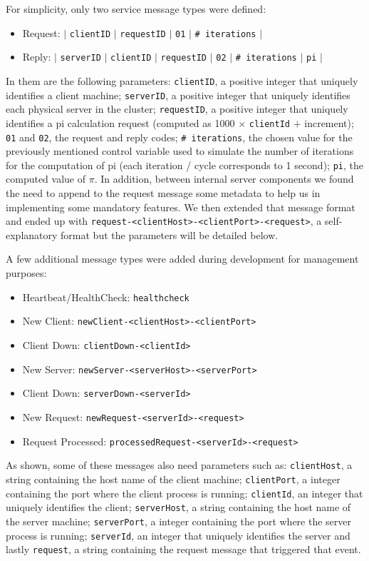 \documentclass[12pt]{article}
\begin{document}
For simplicity, only two service message types were defined:
\vspace{-10pt}
\begin{itemize}[noitemsep]
  \item Request: $|$ \texttt{clientID} $|$ \texttt{requestID} $|$ \texttt{01} $|$ \texttt{\# iterations} $|$
  \item Reply: $|$ \texttt{serverID} $|$ \texttt{clientID} $|$ \texttt{requestID} $|$ \texttt{02} $|$ \texttt{\# iterations} $|$ \texttt{pi} $|$
\end{itemize}
\vspace{-10pt}
In them are the following parameters:
\texttt{clientID}, a positive integer that uniquely identifies a client machine;
\texttt{serverID}, a positive integer that uniquely identifies each physical server in the cluster;
\texttt{requestID}, a positive integer that uniquely identifies a pi calculation request (computed as 1000 $\times$ \texttt{clientId} $+$ increment);
\texttt{01} and \texttt{02}, the request and reply codes;
\texttt{\# iterations}, the chosen value for the previously mentioned control variable used to simulate the number of iterations for the computation of pi
(each iteration / cycle corresponds to 1 second);
\texttt{pi}, the computed value of $\pi$. In addition, between internal server components we found the need to append to the request message some metadata to help us in implementing some mandatory features. We then extended that message format and ended up with \texttt{request-<clientHost>-<clientPort>-<request>}, a self-explanatory format but the parameters will be detailed below.

A few additional message types were added during development for management purposes:
\begin{itemize}[noitemsep]
  \item Heartbeat/HealthCheck: \texttt{healthcheck}
  \item New Client: \texttt{newClient-<clientHost>-<clientPort>}
  \item Client Down: \texttt{clientDown-<clientId>}
  \item New Server: \texttt{newServer-<serverHost>-<serverPort>}
  \item Client Down: \texttt{serverDown-<serverId>}
  \item New Request: \texttt{newRequest-<serverId>-<request>}
  \item Request Processed: \texttt{processedRequest-<serverId>-<request>}
\end{itemize}
\vspace{-10pt}
As shown, some of these messages also need parameters such as: \texttt{clientHost}, a string containing the host name of the client machine; \texttt{clientPort}, a integer containing the port where the client process is running; \texttt{clientId}, an integer that uniquely identifies the client; \texttt{serverHost}, a string containing the host name of the server machine; \texttt{serverPort}, a integer containing the port where the server process is running; \texttt{serverId}, an integer that uniquely identifies the server and lastly \texttt{request}, a string containing the request message that triggered that event.
\end{document}

